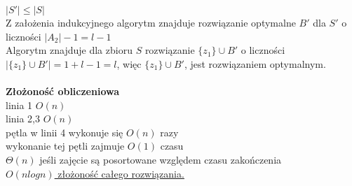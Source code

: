 $\vert S' \vert \leq \vert S \vert$\\
Z założenia indukcyjnego algorytm znajduje rozwiązanie optymalne $B'$ dla $S'$ o liczności $\vert A_2 \vert - 1 = l - 1$\\
Algorytm znajduje dla zbioru $S$ rozwiązanie $\lbrace z_1 \rbrace \cup B'$ o liczności $\vert \lbrace z_1 \rbrace \cup B' \vert = 1 + l - 1 = l$, więc $\lbrace z_1 \rbrace \cup B'$, jest rozwiązaniem optymalnym.\\
\\
\textbf{Złożoność obliczeniowa}\\
linia 1 \tab $O(n)$\\
linia 2,3 \tab $O(n)$\\
pętla w linii 4 wykonuje się $O(n)$ razy\\
\tab wykonanie tej pętli zajmuje $O(1)$ czasu\\
$\Theta(n)$ jeśli zajęcie są posortowane względem czasu zakończenia \\
\underline{$O(nlogn)$ złożoność całego rozwiązania.}


